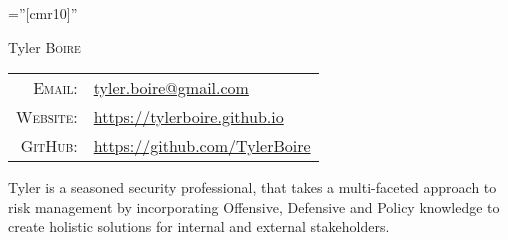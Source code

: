 \documentclass[a4paper,10pt]{article}
\begin{document}
\pagestyle{empty} 		%

\font\fb=''[cmr10]'' 	%

{\Huge Tyler \textsc{Boire}}


\begin{tabular}{rl}
    \textsc{Email:}   & \href{mailto:tyler.boire@gmail.com}{tyler.boire@gmail.com}\\
    \textsc{Website:} & \href{https://tylerboire.github.io}{https://tylerboire.github.io}\\
    \textsc{GitHub:}  & \href{https://github.com/TylerBoire}{https://github.com/TylerBoire}
\end{tabular}

Tyler is a seasoned security professional, that takes a multi-faceted approach to risk management by incorporating Offensive, Defensive and Policy knowledge to create holistic solutions for internal and external stakeholders.
\end{document}
